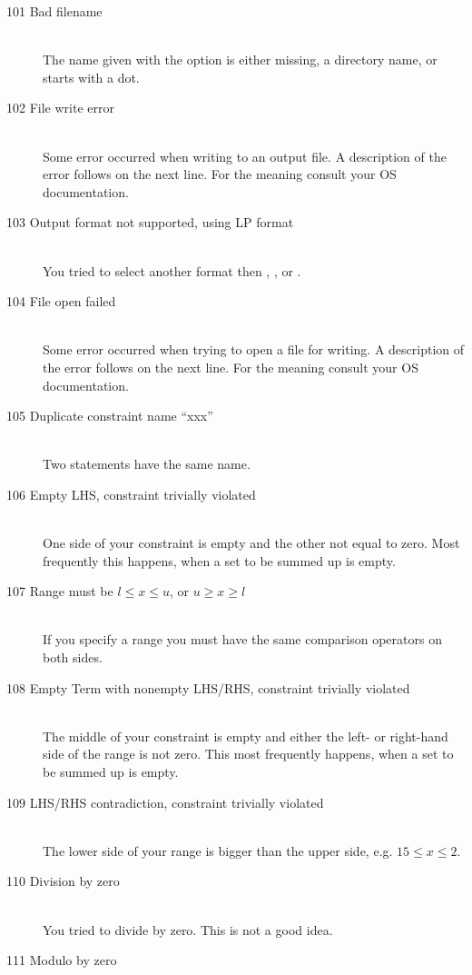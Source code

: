 \begin{description}
%
%
\item[101 Bad filename]\ \\
   The name given with the  option is either missing, 
   a directory name, or starts with a dot.
\item[102 File write error]\ \\
   Some error occurred when writing to an output file. A description of 
   the error follows on the next line. For the meaning 
   consult your OS documentation.
\item[103 Output format not supported, using LP format]\ \\
   You tried to select another format then , , or .
\item[104 File open failed]\ \\
   Some error occurred when trying to open a file for writing. A description of 
   the error follows on the next line. For the meaning 
   consult your OS documentation.
%
%
\item[105 Duplicate constraint name ``xxx'']\ \\
   Two  statements have the same name.
\item[106 Empty LHS, constraint trivially violated]\ \\
   One side of your constraint is empty and the other not equal to
   zero. Most frequently this happens, when a set to be summed up is empty.
\item[107 Range must be $l\leq x\leq u$, or $u \geq x\geq l$]\ \\
   If you specify a range you must have the same comparison operators
   on both sides.
\item[108 Empty Term with nonempty LHS/RHS, constraint trivially
   violated]\ \\
   The middle of your constraint is empty and either the left- or
   right-hand side of the range is not zero.
   This most frequently happens, when a set to be summed up is empty.
\item[109 LHS/RHS contradiction, constraint trivially violated]\ \\
   The lower side of your range is bigger than the upper side, e.g.
   $15\leq x\leq 2$. 
\item[110 Division by zero]\ \\
   You tried to divide by zero. This is not a good idea.
\item[111 Modulo by zero]\ \\

\end{description}
